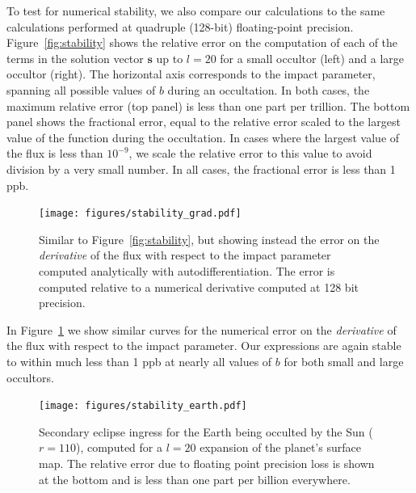 \documentclass[modern]{aastex61}
\begin{document}
To test for numerical stability, we also compare our calculations to
the same calculations performed at quadruple (128-bit) floating-point precision.
Figure~\ref{fig:stability} shows the relative error on the computation of each of the
terms in the solution vector $\mathbf{s}$ up to $l = 20$ for a small occultor (left)
and a large occultor (right). The horizontal axis corresponds to the impact
parameter, spanning all possible values of $b$ during an occultation.
In both cases, the maximum relative error (top panel) is less than one part per
trillion. The bottom panel shows the fractional error, equal to the relative
error scaled to the largest value of the function during the occultation. In cases
where the largest value of the flux is less than $10^{-9}$, we scale the relative
error to this value to avoid division by a very small number. In all cases, the
fractional error is less than 1 ppb.

\begin{figure}[p!]
    \begin{centering}
    \texttt{[image: figures/stability\_grad.pdf]}
    \caption{\label{fig:stability_grad}
             Similar to Figure~\ref{fig:stability}, but showing instead the
             error on the \emph{derivative} of the flux with respect to the impact
             parameter computed analytically with autodifferentiation. The error is computed
             relative to a numerical derivative computed at 128 bit precision.
             }
    \end{centering}
\end{figure}

In Figure~\ref{fig:stability_grad} we show similar curves for the numerical error
on the \emph{derivative} of the flux with respect to the impact parameter. Our
expressions are again stable to within much less than 1 ppb at nearly all values
of $b$ for both small and large occultors.

\begin{figure}[ht!]
    \begin{centering}
    \texttt{[image: figures/stability\_earth.pdf]}
    \caption{\label{fig:stability_earth}
             Secondary eclipse ingress for the Earth being occulted by the Sun
             ($r = 110$), computed for a $l = 20$ expansion of the planet's
             surface map. The relative error due to floating point precision loss
             is shown at the bottom and is
             less than one part per billion everywhere.
             }
    \end{centering}
\end{figure}
\end{document}
